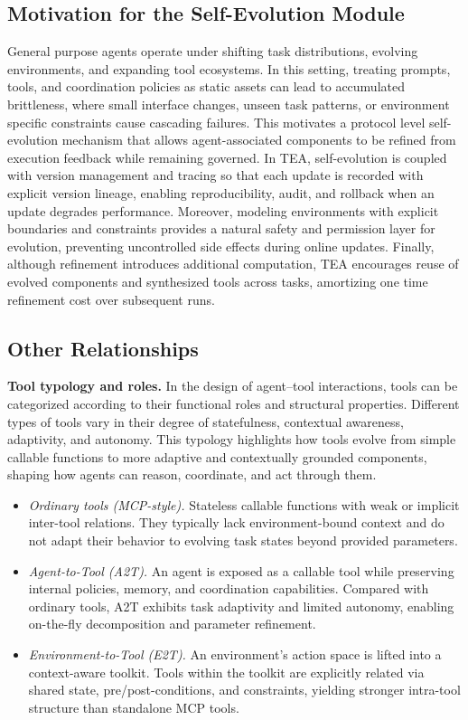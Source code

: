 \documentclass[11pt]{article}
\begin{document}
\subsection{Motivation for the Self-Evolution Module}
General purpose agents operate under shifting task distributions, evolving environments, and expanding tool ecosystems. In this setting, treating prompts, tools, and coordination policies as static assets can lead to accumulated brittleness, where small interface changes, unseen task patterns, or environment specific constraints cause cascading failures. This motivates a protocol level self-evolution mechanism that allows agent-associated components to be refined from execution feedback while remaining governed. In TEA, self-evolution is coupled with version management and tracing so that each update is recorded with explicit version lineage, enabling reproducibility, audit, and rollback when an update degrades performance. Moreover, modeling environments with explicit boundaries and constraints provides a natural safety and permission layer for evolution, preventing uncontrolled side effects during online updates. Finally, although refinement introduces additional computation, TEA encourages reuse of evolved components and synthesized tools across tasks, amortizing one time refinement cost over subsequent runs.

\subsection{Other Relationships}

\textbf{Tool typology and roles.} In the design of agent–tool interactions, tools can be categorized according to their functional roles and structural properties. Different types of tools vary in their degree of statefulness, contextual awareness, adaptivity, and autonomy. This typology highlights how tools evolve from simple callable functions to more adaptive and contextually grounded components, shaping how agents can reason, coordinate, and act through them.
\begin{itemize}[leftmargin=*,itemsep=0.1em]
\item \textit{Ordinary tools (MCP-style).} Stateless callable functions with weak or implicit inter-tool relations. They typically lack environment-bound context and do not adapt their behavior to evolving task states beyond provided parameters.
\item \textit{Agent-to-Tool (A2T).} An agent is exposed as a callable tool while preserving internal policies, memory, and coordination capabilities. Compared with ordinary tools, A2T exhibits task adaptivity and limited autonomy, enabling on-the-fly decomposition and parameter refinement.
\item \textit{Environment-to-Tool (E2T).} An environment’s action space is lifted into a context-aware toolkit. Tools within the toolkit are explicitly related via shared state, pre/post-conditions, and constraints, yielding stronger intra-tool structure than standalone MCP tools.
\end{itemize}
\end{document}
